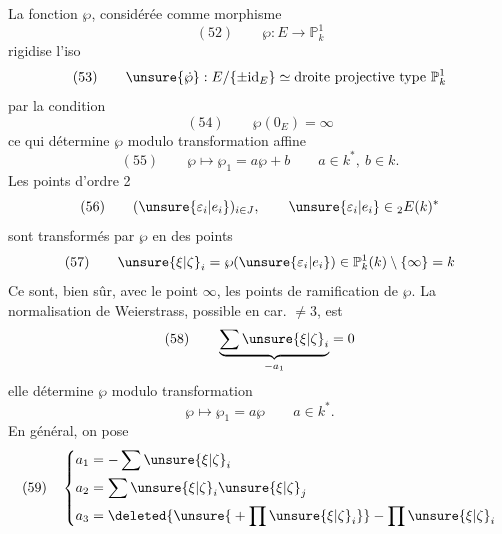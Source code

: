 
La fonction $\wp$, considérée comme morphisme
\[
(52)\qquad\wp:E\longrightarrow\mathbb P^1_k
\]
rigidise l'iso
\[
(53)\qquad\unsure{\dot\wp}:E/\{\pm\mathrm{id}_E\}\simeq
\text{droite projective type }\mathbb P^1_k
\]
par la condition
\[
(54)\qquad\wp(0_E)=\infty
\]
ce qui détermine $\wp$ modulo transformation affine
\[
(55)\qquad\wp\longmapsto\wp_1=a\wp+b\qquad a\in k^*,\ b\in k.
\]
Les points d'ordre 2
\[
(56)\qquad(\unsure{\varepsilon_i|e_i})_{i\in J},\qquad\unsure{\varepsilon_i|e_i}\in{}_2E(k)^*
\]
sont transformés par $\wp$ en des points
\[
(57)\qquad\unsure{\xi|\zeta}_i=\wp(\unsure{\varepsilon_i|e_i})\in\mathbb P^1_k(k)\setminus\{\infty\}=k
\]
Ce sont, bien sûr, avec le point $\infty$, les points de ramification de $\wp$.
La normalisation de Weierstrass, possible en car. $\ne3$,  est
\[
(58)\qquad\underbrace{\sum\unsure{\xi|\zeta}_i}_{-a_1}=0
\]
elle détermine $\wp$ modulo transformation
\[
\wp\longmapsto\wp_1=a\wp\qquad a\in k^*.
\]
En général, on pose
\[
(59)\quad\left\{\begin{aligned}
a_1&=-\sum\unsure{\xi|\zeta}_i\\
a_2&=\sum\unsure{\xi|\zeta}_i\unsure{\xi|\zeta}_j\\
a_3&=\deleted{\unsure{{}+\prod\unsure{\xi|\zeta}_i}}-\prod\unsure{\xi|\zeta}_i
\end{aligned}\right.
\]

